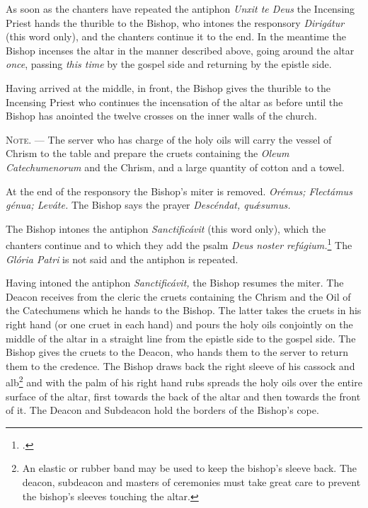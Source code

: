 \documentclass[letterpaper]{report}
\begin{document}
{    As soon as the chanters have repeated the antiphon \textit{Unxit te Deus}
    the Incensing Priest hands the thurible to the Bishop, who intones the
    responsory \textit{Dirig\'atur} (this word only), and the chanters continue
    it to the end. In the meantime the Bishop incenses the altar in the manner
    described above, going around the altar \textit{once}, passing \textit{this
    time} by the gospel side and returning by the epistle side.

    \rubric Having arrived at the middle, in front, the Bishop gives the
    thurible to the Incensing Priest who continues the incensation of the altar
    as before until the Bishop has anointed the twelve crosses on the inner
    walls of the church.

    \textsc{Note. ---} The server who has charge of the holy oils will carry
    the vessel of Chrism to the table and prepare the cruets containing the
    \textit{Oleum Catechumenorum} and the Chrism, and a large
    quantity of cotton and a towel.

    \rubric At the end of the responsory the Bishop's miter is removed.
    \textit{Orémus; Flectámus génua; Leváte.} The Bishop says the prayer
    \textit{Descéndat, qu\'\ae sumus.}

    \rubric The Bishop intones the antiphon \textit{Sanctificávit} (this word
    only), which the chanters continue and to which they add the psalm
    \textit{Deus noster refúgium.}\footcite[The antiphon \textit{Sanctificávit
    Dóminus} may be repeated after each verse of this psalm.][footnote 1, p.
    108.]{consecranda} The \textit{Glória Patri} is not said and the antiphon
    is repeated.

    \rubric Having intoned the antiphon \textit{Sanctificávit,} the Bishop
    resumes the miter. The Deacon receives from the cleric the cruets
    containing the Chrism and the Oil of the Catechumens which he hands to the
    Bishop. The latter takes the cruets in his right hand (or one cruet in each
    hand) and pours the holy oils conjointly on the middle of the altar in a
    straight line from the epistle side to the gospel side. The Bishop gives
    the cruets to the Deacon, who hands them to the server to return them to
    the credence. The Bishop draws back the right sleeve of his cassock and
    alb\footnote{An elastic or rubber band may be used to keep the bishop's
    sleeve back. The deacon, subdeacon and masters of ceremonies must take
    great care to prevent the bishop's sleeves touching the altar.} and with
    the palm of his right hand rubs spreads the holy oils over the entire
    surface of the altar, first towards the back of the altar and then towards
    the front of it. The Deacon and Subdeacon hold the borders of the Bishop's
    cope.

}
\end{document}
